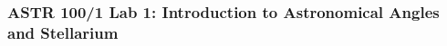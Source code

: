 \documentclass[main.tex]{subfiles}
\begin{document}
\subsubsection{ASTR 100/1 Lab 1: Introduction to Astronomical Angles and Stellarium}
\end{document}

